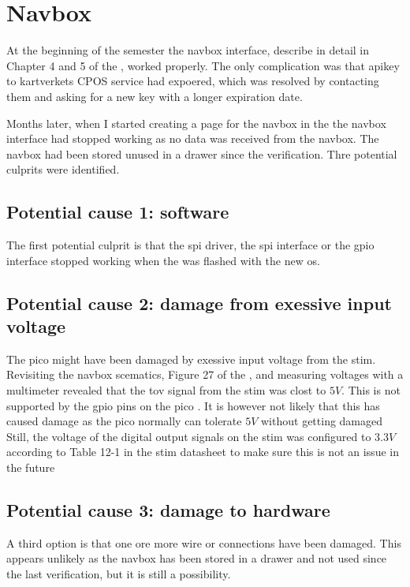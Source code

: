 \section{Navbox}
At the beginning of the semester the \gls{navbox} interface, describe in detail in Chapter 4 and 5 of the \preproject, worked properly.
The only complication was that \gls{apikey} to \gls{kartverket}s CPOS service had expoered, which was resolved by contacting them and asking for a new key with a longer expiration date.

Months later, when I started creating a page for the \gls{navbox} in the \srgui the \gls{navbox} interface had stopped working as no data was received from the \gls{navbox}.
The \gls{navbox} had been stored unused in a drawer since the verification.
Thre potential culprits were identified.

\subsection{Potential cause 1: \jx software}
The first potential culprit is that the \gls{spi} driver, the \gls{spi} \py interface or the \gls{gpio} interface stopped working when the \jx was flashed with the new \gls{os}.

\subsection{Potential cause 2: damage from exessive input voltage}
The \gls{pico} might have been damaged by exessive input voltage from the \gls{stim}.
Revisiting the \gls{navbox} scematics, Figure 27 of the \preproject, and measuring voltages with a multimeter revealed that the \gls{tov} signal from the \gls{stim} was clost to $5V$.
This is not supported by the \gls{gpio} pins on the \gls{pico} \cite[17]{PicoDatasheet}.
It is however not likely that this has caused damage as the \gls{pico} normally can tolerate $5V$ without getting damaged \cite{aryavoronovaRP20405VLogic2023}
Still, the voltage of the digital output signals on the \gls{stim} was configured to $3.3V$ according to Table 12-1 in the \gls{stim} datasheet to make sure this is not an issue in the future \cite[118]{safranSTIM300Datasheet}

\subsection{Potential cause 3: damage to hardware}
A third option is that one ore more wire or connections have been damaged.
This appears unlikely as the \gls{navbox} has been stored in a drawer and not used since the last verification, but it is still a possibility.

